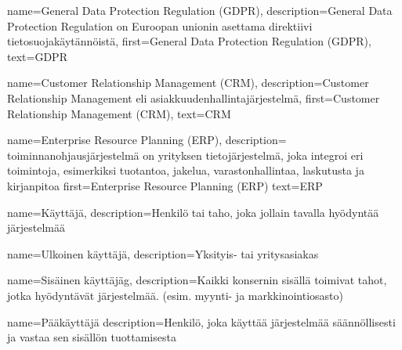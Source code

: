 %
%
%

\makeglossaries



    {
    name={General Data Protection Regulation (GDPR)},
	description={General Data Protection Regulation on Euroopan unionin asettama direktiivi tietosuojakäytännöistä},
	first={General Data Protection Regulation (GDPR)},
	text={GDPR}
    }

    {
	name={Customer Relationship Management (CRM)},
	description={Customer Relationship Management eli asiakkuudenhallintajärjestelmä},
	first={Customer Relationship Management (CRM)},
	text={CRM}
    }

    {
    name={Enterprise Resource Planning (ERP)},
    description={ toiminnanohjausjärjestelmä on yrityksen tietojärjestelmä, joka integroi eri toimintoja, esimerkiksi tuotantoa, jakelua, varastonhallintaa, laskutusta ja kirjanpitoa}
    first={Enterprise Resource Planning (ERP)}
    text={ERP}
    }

    {
    name={Käyttäjä},
    description={Henkilö tai taho, joka jollain tavalla hyödyntää järjestelmää}
    }

    {
    name={Ulkoinen käyttäjä},
    description={Yksityis- tai yritysasiakas}
    }

    {
    name={Sisäinen käyttäjäg},
    description={Kaikki konsernin sisällä toimivat tahot, jotka hyödyntävät järjestelmää. (esim. myynti- ja markkinointiosasto)}
    }

    {
    name={Pääkäyttäjä}
    description={Henkilö, joka käyttää järjestelmää säännöllisesti ja vastaa sen sisällön tuottamisesta}
    }


